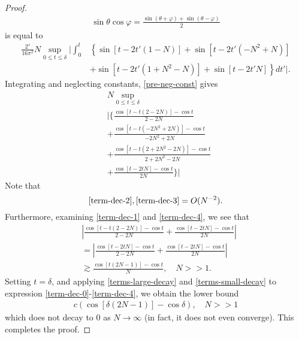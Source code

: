 \documentclass[12pt,reqno]{amsart}
\numberwithin{equation}{section}  %
\newcommand{\vp}{\varphi}
\begin{document}
\begin{proof}
\begin{equation*}
\begin{split}
\sin \theta \cos \vp = \frac{\sin (\theta + \vp) + \sin(\theta - \vp)}{2}
\end{split}
\end{equation*}
%
%
is equal to
%
%
\begin{equation}
  \label{pre-neg-const}
\begin{split}
  \frac{2^{s}}{16\pi^{2}}  N \sup_{0 \le t \le \delta} 
 | \int_{0}^{t} & \left\{  \sin[t - 2t'(1 - N)] +  \sin[t - 2t'(-N^{2} + N)]
 \right.
 \\
 & + \left . \sin[t - 2t'(1 + N^{2} - N)] + \sin[t - 2t'N]
 \right\} dt' |.
\end{split}
\end{equation}
%
%
Integrating and neglecting constants, \eqref{pre-neg-const} gives
%
%
\begin{align}
  \label{term-dec-0}
 & N \sup_{0 \le t \le \delta}  
 \\
 & | \big \{ \frac{\cos[t - t(2 -2N)] - \cos t}{2 - 2N}
 \label{term-dec-1}
 \\
 & + \frac{\cos[t - t(-2N^{2} + 2N)] - \cos t}{-2N^{2} + 2N}
 \label{term-dec-2}
 \\
 & + \frac{\cos [t -t(2 + 2N^{2} - 2N)] - \cos t }{2 + 2N^{2} - 2N}
 \label{term-dec-3}
 \\
 & + \frac{\cos[t - 2tN] - \cos t}{2N} \big \} |
 \label{term-dec-4}
\end{align}
%
%
Note that
\begin{equation}
  \label{terms-large-decay}
  \eqref{term-dec-2}, \eqref{term-dec-3} = O(N^{-2}).
\end{equation} 
Furthermore, examining \eqref{term-dec-1} and \eqref{term-dec-4},
we see that
%
%
\begin{equation}
  \label{terms-small-decay}
\begin{split}
& | \frac{\cos[t - t(2 -2N)] - \cos t}{2 - 2N}
+ \frac{\cos[t - 2tN] - \cos t}{2N} |
\\
& = | \frac{\cos[t -2tN] - \cos t}{2 - 2N}
+ \frac{\cos[t - 2tN] - \cos t}{2N} |
\\
& \gtrsim \frac{\cos[t(2N -1)] - \cos t}{N}, \quad N >> 1.
\end{split}
\end{equation}
%
%
Setting $t = \delta$, and applying \eqref{terms-large-decay} and
\eqref{terms-small-decay} to expression \eqref{term-dec-0}-\eqref{term-dec-4}, 
we obtain the lower bound
%
%
%
%
\begin{equation*}
\begin{split}
c (\cos[\delta (2N-1)] - \cos \delta ), \quad N >> 1
\end{split}
\end{equation*}
%
%
which does not decay to $0$ as $N \to \infty$ (in fact, it does not even
converge). This completes the proof. 
\end{proof}
%
%
%
%
%
%
%
%
%
%
%
%
%
\end{document}
